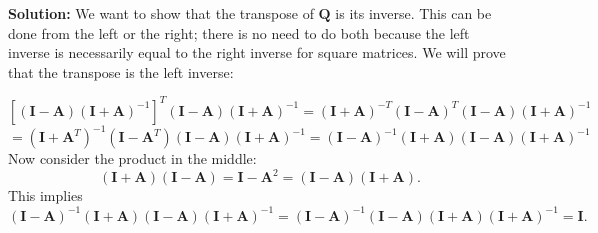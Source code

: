\documentclass[11pt,fleqn]{article}
\begin{document}
\begin{enumerate}
\begin{itemize}
	{\bf Solution:} We want to show that the transpose of $\mathbf{Q}$ is its inverse. This can be done from the left or the right; there is no need to do both because the left inverse is necessarily equal to the right inverse for square matrices. We will prove that the transpose is the left inverse:
	
	\[\left[(\mathbf{I}-\mathbf{A})(\mathbf{I}+\mathbf{A})^{-1}\right]^T(\mathbf{I}-\mathbf{A})(\mathbf{I}+\mathbf{A})^{-1}=(\mathbf{I}+\mathbf{A})^{-T}(\mathbf{I}-\mathbf{A})^T(\mathbf{I}-\mathbf{A})(\mathbf{I}+\mathbf{A})^{-1}\]
	\[=(\mathbf{I}+\mathbf{A}^T)^{-1}(\mathbf{I}-\mathbf{A}^T)(\mathbf{I}-\mathbf{A})(\mathbf{I}+\mathbf{A})^{-1}=(\mathbf{I}-\mathbf{A})^{-1}(\mathbf{I}+\mathbf{A})(\mathbf{I}-\mathbf{A})(\mathbf{I}+\mathbf{A})^{-1}\]
	Now consider the product in the middle:
	\[(\mathbf{I}+\mathbf{A})(\mathbf{I}-\mathbf{A}) = \mathbf{I} - \mathbf{A}^2 = (\mathbf{I}-\mathbf{A})(\mathbf{I}+\mathbf{A}).\]
	This implies
	\[(\mathbf{I}-\mathbf{A})^{-1}(\mathbf{I}+\mathbf{A})(\mathbf{I}-\mathbf{A})(\mathbf{I}+\mathbf{A})^{-1}=(\mathbf{I}-\mathbf{A})^{-1}(\mathbf{I}-\mathbf{A})(\mathbf{I}+\mathbf{A})(\mathbf{I}+\mathbf{A})^{-1} = \mathbf{I}.\]
	\end{itemize}
\end{enumerate}
 
\end{document}
